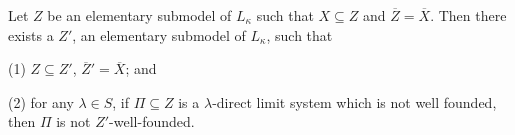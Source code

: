 Let $Z$ be an elementary submodel of $L_\kappa$ such that $X \subseteq Z$ and $\overline{Z} = \overline{X}$. Then there exists a $Z'$, an elementary submodel of $L_\kappa$, such that

(1) $Z \subseteq Z'$, $\overline{Z}' = \overline{X}$; and

(2) for any $\lambda \in S$, if $\Pi \subseteq Z$ is a $\lambda$-direct limit system which is not well founded, then $\Pi$ is not $Z'$-well-founded.
